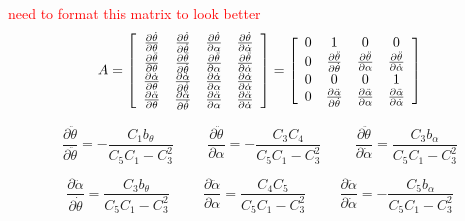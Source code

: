 \documentclass{article}
\newcommand{\xxx}[1]{\textcolor{red}{#1}}
\theoremstyle{plain}
\theoremstyle{definition}
\theoremstyle{remark}
\begin{document}
\xxx{need to format this matrix to look better}
$$ A = \left[ \begin{array}{c c c c l}
	\frac{\partial \dot{\theta}}{\partial \theta} & \frac{\partial \dot{\theta}}{\partial \dot{\theta}} & \frac{\partial \dot{\theta}}{\partial \alpha} & \frac{\partial \dot{\theta}}{\partial \dot{\alpha}}\\
	\frac{\partial \ddot{\theta}}{\partial \theta} & \frac{\partial \ddot{\theta}}{\partial \dot{\theta}} & \frac{\partial \ddot{\theta}}{\partial \alpha} & \frac{\partial \ddot{\theta}}{\partial \dot{\alpha}}\\
	\frac{\partial \dot{\alpha}}{\partial \theta} & \frac{\partial \dot{\alpha}}{\partial \dot{\theta}} & \frac{\partial \dot{\alpha}}{\partial \alpha} & \frac{\partial \dot{\alpha}}{\partial \dot{\alpha}}\\
	\frac{\partial \ddot{\alpha}}{\partial \theta} & \frac{\partial \ddot{\alpha}}{\partial \dot{\theta}} & \frac{\partial \ddot{\alpha}}{\partial \alpha} & \frac{\partial \ddot{\alpha}}{\partial \dot{\alpha}}\\
 \end{array} \right] = 
\left[ \begin{array}{c c c c l} 
0 & 1 & 0 & 0 \\
0 & \frac{\partial \ddot{\theta}}{\partial \dot{\theta}} & \frac{\partial \ddot{\theta}}{\partial \alpha} & \frac{\partial \ddot{\theta}}{\partial \dot{\alpha}} \\
0 & 0 & 0 & 1 \\
0 & \frac{\partial \ddot{\alpha}}{\partial \dot{\theta}} & \frac{\partial \ddot{\alpha}}{\partial \alpha} & \frac{\partial \ddot{\alpha}}{\partial \dot{\alpha}} \\
\end{array} \right]$$

$$ \frac{\partial \ddot{\theta}}{\partial \ddot{\theta}} = -\frac{C_1 b_{\theta}}{C_5 C_1 - C_3^2}  \hspace{1cm} \frac{\partial \ddot{\theta}}{\partial \alpha} = -\frac{C_3 C_4}{C_5 C_1 - C_3^2}
\hspace{1cm} \frac{\partial \ddot{\theta}}{\partial \dot{\alpha}} = \frac{C_3 b_{\alpha}}{C_5 C_1 - C_3^2}$$

$$ \frac{\partial \ddot{\alpha}}{\partial \dot{\theta}} = \frac{C_3 b_{\theta}}{C_5 C_1 - C_3^2} \hspace{1cm}  \frac{\partial \ddot{\alpha}}{\partial \alpha} = \frac{C_4 C_5}{C_5 C_1 - C_3^2} \hspace{1cm} \frac{\partial \ddot{\alpha}}{\partial \dot{\alpha}} = - \frac{C_5 b_{\alpha}}{C_5 C_1 - C_3^2}$$
\end{document}
